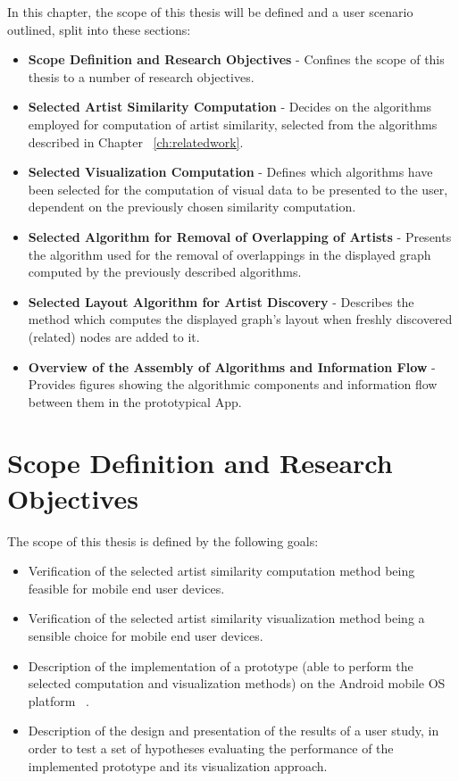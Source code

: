 In this chapter, the scope of this thesis will be defined and a user scenario outlined, split into these sections:

\begin{itemize}
	\item \textbf {Scope Definition and Research Objectives} - Confines the scope of this thesis to a number of research objectives.
	\item \textbf {Selected Artist Similarity Computation} - Decides on the algorithms employed for computation of artist similarity, selected from the algorithms described in Chapter ~\ref{ch:relatedwork}.
	\item \textbf {Selected Visualization Computation} - Defines which algorithms have been selected for the computation of visual data to be presented to the user, dependent on the previously chosen similarity computation.
	\item \textbf {Selected Algorithm for Removal of Overlapping of Artists} - Presents the algorithm used for the removal of overlappings in the displayed graph computed by the previously described algorithms.
	\item \textbf {Selected Layout Algorithm for Artist Discovery} - Describes the method which computes the displayed graph's layout when freshly discovered (related) nodes are added to it.
	\item \textbf {Overview of the Assembly of Algorithms and Information Flow} - Provides figures showing the algorithmic components and information flow between them in the prototypical App.
\end{itemize}

\section{Scope Definition and Research Objectives}

The scope of this thesis is defined by the following goals: 

\begin{itemize}
	\item Verification of the selected artist similarity computation method being feasible for mobile end user devices.
	\item Verification of the selected artist similarity visualization method being a sensible choice for mobile end user devices.
	\item Description of the implementation of a prototype (able to perform the selected computation and visualization methods) on the Android mobile OS platform ~\cite{url:android}.
	\item Description of the design and presentation of the results of a user study, in order to test a set of hypotheses evaluating the performance of the implemented prototype and its visualization approach.
\end{itemize}

